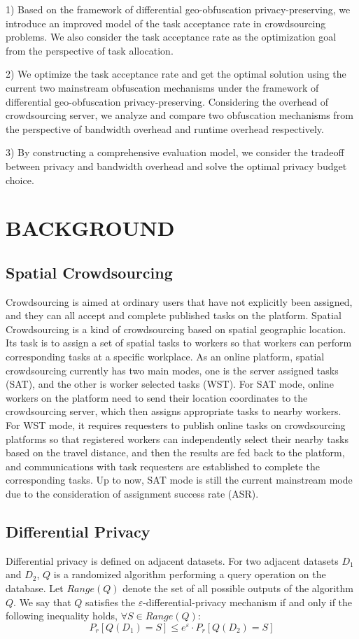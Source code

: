 1) Based on the framework of differential geo-obfuscation privacy-preserving, we introduce an improved model of the task acceptance rate in crowdsourcing problems. We also consider the task acceptance rate as the optimization goal from the perspective of task allocation.

2) We optimize the task acceptance rate and get the optimal solution using the current two mainstream obfuscation mechanisms under the framework of differential geo-obfuscation privacy-preserving. Considering the overhead of crowdsourcing server, we analyze and compare two obfuscation mechanisms from the perspective of bandwidth overhead and runtime overhead respectively.

3) By constructing a comprehensive evaluation model, we consider the tradeoff between privacy and bandwidth overhead and solve the optimal privacy budget choice.

\section{BACKGROUND}

\subsection{Spatial Crowdsourcing}
Crowdsourcing is aimed at ordinary users that have not explicitly been assigned, and they can all accept and complete published tasks on the platform. Spatial Crowdsourcing is a kind of crowdsourcing based on spatial geographic location. Its task is to assign a set of spatial tasks to workers so that workers can perform corresponding tasks at a specific workplace. As an online platform, spatial crowdsourcing currently has two main modes, one is the server assigned tasks (SAT), and the other is worker selected tasks (WST). For SAT mode, online workers on the platform need to send their location coordinates to the crowdsourcing server, which then assigns appropriate tasks to nearby workers. For WST mode, it requires requesters to publish online tasks on crowdsourcing platforms so that registered workers can independently select their nearby tasks based on the travel distance, and then the results are fed back to the platform, and communications with task requesters are established to complete the corresponding tasks. Up to now, SAT mode is still the current mainstream mode due to the consideration of assignment success rate (ASR).

\subsection{Differential Privacy}
\begin{definition}
	Differential privacy is defined on adjacent datasets. For two adjacent datasets $D_1$ and $D_2$, $Q$ is a randomized algorithm performing a query operation on the database. Let $Range(Q)$ denote the set of all possible outputs of the algorithm $Q$. We say that $Q$ satisfies the $\varepsilon$-differential-privacy mechanism if and only if the following inequality holds, $\forall S \in Range(Q)$:
	$$
	P_r[Q(D_1)=S]\leq e^\varepsilon \cdot P_r [Q(D_2)=S]
	$$
\end{definition}

